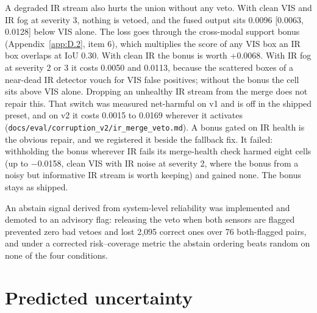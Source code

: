 \documentclass[journal,onecolumn]{IEEEtran}
\begin{document}
A degraded IR stream also hurts the union without any veto. With clean VIS and IR fog at severity 3, nothing is vetoed, and the fused output sits 0.0096 [0.0063, 0.0128] below VIS alone. The loss goes through the cross-modal support bonus (Appendix~\ref{app:D.2}, item 6), which multiplies the score of any VIS box an IR box overlaps at IoU 0.30. With clean IR the bonus is worth +0.0068. With IR fog at severity 2 or 3 it costs 0.0050 and 0.0113, because the scattered boxes of a near-dead IR detector vouch for VIS false positives; without the bonus the cell sits above VIS alone. Dropping an unhealthy IR stream from the merge does not repair this. That switch was measured net-harmful on v1 and is off in the shipped preset, and on v2 it costs 0.0015 to 0.0169 wherever it activates (\texttt{docs/\allowbreak{}eval/\allowbreak{}corruption\_\allowbreak{}v2/\allowbreak{}ir\_\allowbreak{}merge\_\allowbreak{}veto.md}). A bonus gated on IR health is the obvious repair, and we registered it beside the fallback fix. It failed: withholding the bonus wherever IR fails its merge-health check harmed eight cells (up to $-$0.0158, clean VIS with IR noise at severity 2, where the bonus from a noisy but informative IR stream is worth keeping) and gained none. The bonus stays as shipped.

An abstain signal derived from system-level reliability was implemented and demoted to an advisory flag: releasing the veto when both sensors are flagged prevented zero bad vetoes and lost 2,095 correct ones over 76 both-flagged pairs, and under a corrected risk--coverage metric the abstain ordering beats random on none of the four conditions.

\FloatBarrier
\section{Predicted uncertainty}\label{app:E}
\end{document}
